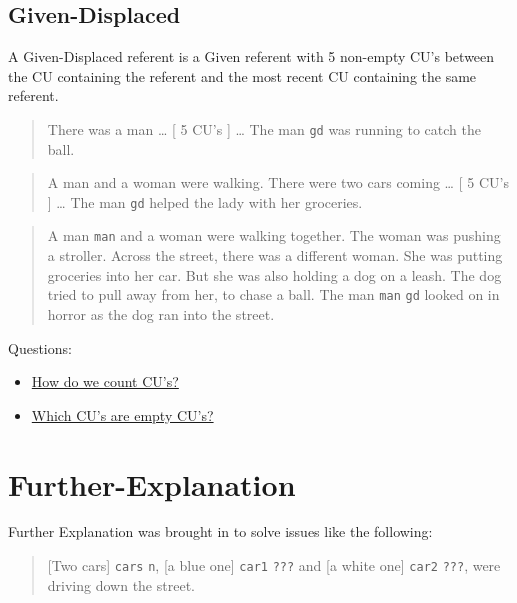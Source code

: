 \documentclass[
]{book}
\providecommand{\tightlist}{%
  \setlength{\itemsep}{0pt}\setlength{\parskip}{0pt}}
\begin{document}
\hypertarget{given-displaced}{%
\subsection{Given-Displaced}\label{given-displaced}}

A Given-Displaced referent is a Given referent with 5 non-empty CU's between the CU containing the referent and the most recent CU containing the same referent.

\begin{quote}
There was a man \ldots{}
{[} 5 CU's {]} \ldots{}
The man \texttt{gd} was running to catch the ball.
\end{quote}

\begin{quote}
A man and a woman were walking.
There were two cars coming \ldots{}
{[} 5 CU's {]} \ldots{}
The man \texttt{gd} helped the lady with her groceries.
\end{quote}

\begin{quote}
A man \texttt{man} and a woman were walking together.
The woman was pushing a stroller.
Across the street, there was a different woman.
She was putting groceries into her car.
But she was also holding a dog on a leash.
The dog tried to pull away from her, to chase a ball.
The man \texttt{man} \texttt{gd} looked on in horror as the dog ran into the street.
\end{quote}

Questions:

\begin{itemize}
\tightlist
\item
  \protect\hyperlink{counting-cus}{How do we count CU's?}
\item
  \protect\hyperlink{empty-cus}{Which CU's are empty CU's?}
\end{itemize}

\hypertarget{further-explanation}{%
\section{Further-Explanation}\label{further-explanation}}

Further Explanation was brought in to solve issues like the following:

\begin{quote}
{[}Two cars{]} \texttt{cars} \texttt{n}, {[}a blue one{]} \texttt{car1} \texttt{???} and {[}a white one{]} \texttt{car2} \texttt{???}, were driving down the street.
\end{quote}
\end{document}
